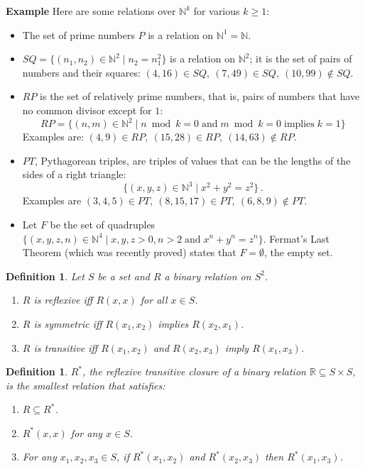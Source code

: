 \documentclass[12pt,a4paper]{article}
\newtheorem{definition}[theorem]{Definition}
\newcommand*{\comma}{,\:}
\newenvironment{example}{\textbf{Example}}{}
\begin{document}
\begin{example}
Here are some relations over $\mathbb{N}^k$ for various $k\ge 1$:
\begin{itemize}
\item The set of prime numbers $P$ is a relation on
$\mathbb{N}^1=\mathbb{N}$.

\item
$SQ = \{(n_1,n_2)\in \mathbb{N}^2\mid n_2=n_1^2\}$ is a relation on
$\mathbb{N}^2$; it is the set of pairs of numbers and their squares:
$(4,16)\in SQ\comma (7,49)\in SQ\comma (10,99)\not \in SQ$.

\item $RP$ is the set of relatively prime numbers, that is, pairs of numbers that have no common divisor except for $1$:
\[RP = \{(n,m)\in \mathbb{N}^2\mid n \bmod k = 0 \;\textrm{and}\;
m \bmod k = 0 \;\textrm{implies}\; k = 1\}
\]
Examples are:
$(4,9)\in RP\comma (15,28) \in RP\comma (14,63)\not\in RP$.

\item $PT$, Pythagorean triples, are triples of values that can be the lengths of the sides of a right triangle:
\[
\{(x,y,z) \in \mathbb{N}^3\mid x^{2}+y^{2}=z^{2}\}\,.
\]
 Examples are $(3,4,5)\in PT\comma (8,15,17)\in PT\comma (6,8,9)\not\in PT$.
 
\item Let $F$ be the set of quadruples $\{(x,y,z,n)\in \mathbb{N}^4\mid x,y,z>0, n>2 \;\textrm{and}\; x^{n}+y^{n}=z^{n}\}$. Fermat's Last Theorem (which was recently proved) states that $F=\emptyset$, the empty set.
\end{itemize}
\end{example}

\begin{definition}\label{def.reflextrans}
Let $S$ be a set and $R$ a binary relation on $S^{2}$.
\begin{enumerate}
\item $R$ is \emph{reflexive} iff $R(x,x)$ for all $x\in S$.
\item $R$ is \emph{symmetric} iff $R(x_{1},x_{2})$ implies
$R(x_{2},x_{1})$.
\item $R$ is \emph{transitive} iff $R(x_{1},x_{2})$ and $R(x_{2},x_{3})$
imply $R(x_{1},x_{3})$.
\end{enumerate}
\end{definition}

\begin{definition}
$R^{*}$, the \emph{reflexive transitive closure of a binary relation $\mathbb{R}\subseteq S\times S$},
 is the smallest relation that satisfies:
\begin{enumerate}
\item $R\subseteq R^{*}$.
\item $R^{*}(x,x)$ for any $x\in S$.
\item For any $x_1,x_2,x_3\in S$, if $R^{*}(x_{1},x_{2})$ and
$R^{*}(x_{2},x_{3})$ then $R^{*}(x_{1},x_{3})$.
\end{enumerate}
\end{definition}
\end{document}
